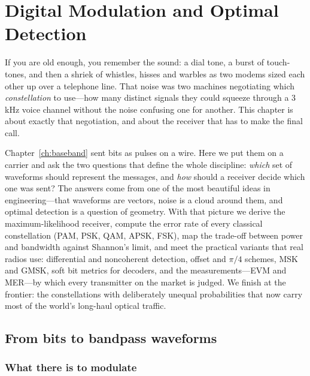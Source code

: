 \chapter{Digital Modulation and Optimal Detection}
\label{ch:modulation}

\begin{chapterintro}
If you are old enough, you remember the sound: a dial tone, a burst of touch-tones, and then
a shriek of whistles, hisses and warbles as two modems sized each other up over a telephone
line. That noise was two machines negotiating which \emph{constellation} to use---how many
distinct signals they could squeeze through a 3\,kHz voice channel without the noise confusing
one for another. This chapter is about exactly that negotiation, and about the receiver that has
to make the final call.

Chapter~\ref{ch:baseband} sent bits as pulses on a wire. Here we put them on a carrier and ask the
two questions that define the whole discipline: \emph{which} set of waveforms should represent the
messages, and \emph{how} should a receiver decide which one was sent? The answers come from one of
the most beautiful ideas in engineering---that waveforms are vectors, noise is a cloud around
them, and optimal detection is a question of geometry. With that picture we derive the
maximum-likelihood receiver, compute the error rate of every classical constellation (PAM, PSK,
QAM, APSK, FSK), map the trade-off between power and bandwidth against Shannon's limit, and meet
the practical variants that real radios use: differential and noncoherent detection, offset and
$\pi/4$ schemes, MSK and GMSK, soft bit metrics for decoders, and the measurements---EVM and
MER---by which every transmitter on the market is judged. We finish at the frontier: the
constellations with deliberately unequal probabilities that now carry most of the world's
long-haul optical traffic.
\end{chapterintro}


\section{From bits to bandpass waveforms}
\label{sec:ch09:bandpass}

\subsection{What there is to modulate}

